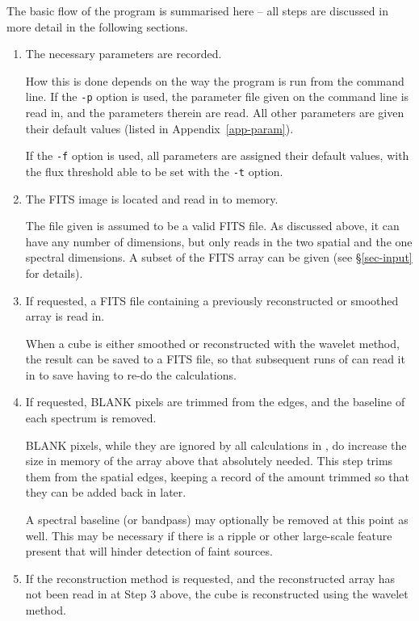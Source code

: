 The basic flow of the program is summarised here -- all steps are
discussed in more detail in the following sections.
\begin{enumerate}
\item The necessary parameters are recorded.

  How this is done depends on the way the program is run from the
  command line. If the \texttt{-p} option is used, the parameter file
  given on the command line is read in, and the parameters therein are
  read. All other parameters are given their default values (listed in
  Appendix~\ref{app-param}).

  If the \texttt{-f} option is used, all parameters are assigned their
  default values, with the flux threshold able to be set with the
  \texttt{-t} option.

\item The FITS image is located and read in to memory.

  The file given is assumed to be a valid FITS file. As discussed
  above, it can have any number of dimensions, but \duchamp only
  reads in the two spatial and the one spectral dimensions. A subset
  of the FITS array can be given (see \S\ref{sec-input} for details).

\item \label{step-reuse} If requested, a FITS file containing a
  previously reconstructed or smoothed array is read in.

  When a cube is either smoothed or reconstructed with the \atrous
  wavelet method, the result can be saved to a FITS file, so that
  subsequent runs of \duchamp can read it in to save having to re-do
  the calculations.

\item \label{step-blank} If requested, BLANK pixels are trimmed from
  the edges, and the baseline of each spectrum is removed.

  BLANK pixels, while they are ignored by all calculations in
  \duchamp, do increase the size in memory of the array above that
  absolutely needed. This step trims them from the spatial edges,
  keeping a record of the amount trimmed so that they can be added
  back in later.

  A spectral baseline (or bandpass) may optionally be removed at this
  point as well. This may be necessary if there is a ripple or other
  large-scale feature present that will hinder detection of faint
  sources.

\item If the reconstruction method is requested, and the reconstructed
  array has not been read in at Step 3 above, the cube is
  reconstructed using the \atrous wavelet method.


\end{enumerate}
